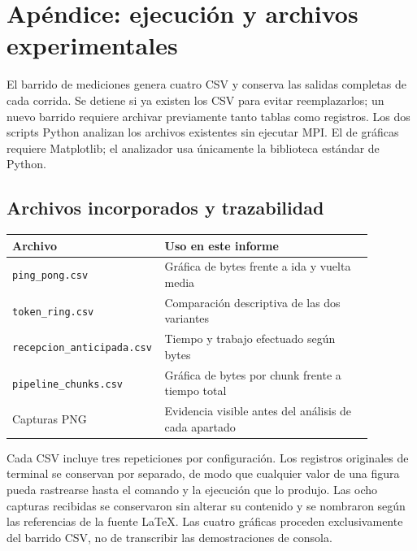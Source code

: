 \documentclass[11pt,letterpaper]{article}
\newcommand{\heading}[1]{\section{\textcolor{azul}{#1}}}
\newcommand{\subheading}[1]{\subsection{\textcolor{azul}{#1}}}
\begin{document}
\clearpage
\heading{Apéndice: ejecución y archivos experimentales}

\begin{center}
\end{center}

El barrido de mediciones genera cuatro CSV y conserva las salidas completas
de cada corrida. Se detiene si ya existen los CSV para evitar reemplazarlos;
un nuevo barrido requiere archivar previamente tanto tablas como registros.
Los dos scripts Python analizan los archivos existentes sin ejecutar MPI.
El de gráficas requiere Matplotlib; el analizador usa únicamente la
biblioteca estándar de Python.

\subheading{Archivos incorporados y trazabilidad}

\begin{center}
\begin{tabular}{@{}L{0.30\linewidth}L{0.58\linewidth}@{}}
\toprule
\textbf{Archivo} & \textbf{Uso en este informe} \\
\midrule
\texttt{ping\_pong.csv} & Gráfica de bytes frente a ida y vuelta media \\
\texttt{token\_ring.csv} & Comparación descriptiva de las dos variantes \\
\texttt{recepcion\_anticipada.csv} & Tiempo y trabajo efectuado según bytes \\
\texttt{pipeline\_chunks.csv} & Gráfica de bytes por chunk frente a tiempo total \\
Capturas PNG & Evidencia visible antes del análisis de cada apartado \\
\bottomrule
\end{tabular}
\end{center}

Cada CSV incluye tres repeticiones por configuración. Los registros
originales de terminal se conservan por separado, de modo que cualquier
valor de una figura pueda rastrearse hasta el comando y la ejecución que
lo produjo. Las ocho capturas recibidas se conservaron sin alterar su
contenido y se nombraron según las referencias de la fuente LaTeX.
Las cuatro gráficas proceden exclusivamente del barrido CSV, no de
transcribir las demostraciones de consola.
\end{document}
